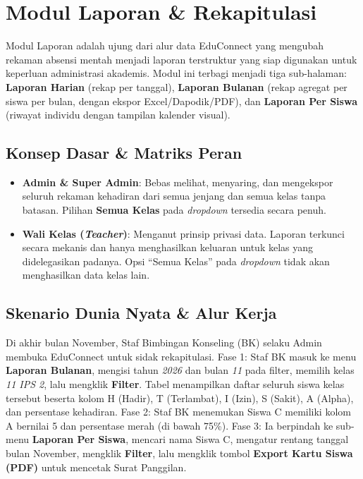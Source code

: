 \chapter{Modul Laporan \& Rekapitulasi}

Modul Laporan adalah ujung dari alur data EduConnect yang mengubah rekaman absensi mentah menjadi laporan terstruktur yang siap digunakan untuk keperluan administrasi akademis. Modul ini terbagi menjadi tiga sub-halaman: \textbf{Laporan Harian} (rekap per tanggal), \textbf{Laporan Bulanan} (rekap agregat per siswa per bulan, dengan ekspor Excel/Dapodik/PDF), dan \textbf{Laporan Per Siswa} (riwayat individu dengan tampilan kalender visual).

\section{Konsep Dasar \& Matriks Peran}
\begin{itemize}
    \item \textbf{Admin \& Super Admin}: Bebas melihat, menyaring, dan mengekspor seluruh rekaman kehadiran dari semua jenjang dan semua kelas tanpa batasan. Pilihan \textbf{Semua Kelas} pada \textit{dropdown} tersedia secara penuh.
    \item \textbf{Wali Kelas (\textit{Teacher})}: Menganut prinsip privasi data. Laporan terkunci secara mekanis dan hanya menghasilkan keluaran untuk kelas yang didelegasikan padanya. Opsi ``Semua Kelas'' pada \textit{dropdown} tidak akan menghasilkan data kelas lain.
\end{itemize}

\section{Skenario Dunia Nyata \& Alur Kerja}

Di akhir bulan November, Staf Bimbingan Konseling (BK) selaku Admin membuka EduConnect untuk sidak rekapitulasi. Fase 1: Staf BK masuk ke menu \textbf{Laporan Bulanan}, mengisi tahun \textit{2026} dan bulan \textit{11} pada filter, memilih kelas \textit{11 IPS 2}, lalu mengklik \textbf{Filter}. Tabel menampilkan daftar seluruh siswa kelas tersebut beserta kolom H (Hadir), T (Terlambat), I (Izin), S (Sakit), A (Alpha), dan persentase kehadiran. Fase 2: Staf BK menemukan Siswa C memiliki kolom A bernilai 5 dan persentase merah (di bawah 75\%). Fase 3: Ia berpindah ke sub-menu \textbf{Laporan Per Siswa}, mencari nama Siswa C, mengatur rentang tanggal bulan November, mengklik \textbf{Filter}, lalu mengklik tombol \textbf{Export Kartu Siswa (PDF)} untuk mencetak Surat Panggilan.

